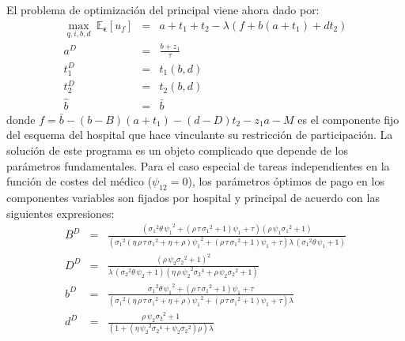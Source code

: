 ﻿\documentclass[12pt,letterpaper]{article}
\begin{document}
El problema de optimización del principal viene ahora dado por:
\begin{eqnarray*}
  \max\limits_{q,i,b,d}\ \mathbb{E}_{\mathbold{\epsilon}}[u_f]&=&a+t_1+t_2-\lambda\left (f+b(a+t_1)+dt_2\right ) \\
  a^D&=&\frac{b+z_1}{\tau}\\
  t_1^D &=& t_1(b,d) \\
  t_2^D &=& t_2(b,d)\\
  \hat{b}&=&\bar{b}
\end{eqnarray*}
donde $f=\bar{b}-(b-B)(a+t_1)-(d-D)t_2-z_1a-M$ es el componente fijo del esquema del hospital que hace vinculante su restricción de participación. La solución de este programa es un objeto complicado que depende de los parámetros fundamentales. Para el caso especial de tareas independientes en la función de costes del médico ($\psi_{12}=0$), los parámetros óptimos de pago en los componentes variables son fijados por hospital y principal de acuerdo con las siguientes expresiones:
\begin{eqnarray*}
  B^D &=& {\frac { \left( {\sigma_{{1}}}^{2}\theta\,{\psi_{{1}}}^{2}+ \left(\rho\,\tau\,{\sigma_{{1}}}^{2}+1 \right) \psi_{{1}}+\tau \right)
 \left( \rho\,\psi_{{1}}{\sigma_{{1}}}^{2}+1 \right) }{ \left( {\sigma
_{{1}}}^{2} \left( \eta\,\rho\,\tau\,{\sigma_{{1}}}^{2}+\eta+\rho
 \right) {\psi_{{1}}}^{2}+ \left( \rho\,\tau\,{\sigma_{{1}}}^{2}+1
 \right) \psi_{{1}}+\tau \right) \lambda\, \left( {\sigma_{{1}}}^{2}
\theta\,\psi_{{1}}+1 \right) }} \\
  D ^D&=& {\frac { \left( \rho\,\psi_{{2}}{\sigma_{{2}}}^{2}+1 \right) ^{2}}{
\lambda\, \left( {\sigma_{{2}}}^{2}\theta\,\psi_{{2}}+1 \right)
 \left( \eta\,\rho\,{\psi_{{2}}}^{2}{\sigma_{{2}}}^{4}+\rho\,\psi_{{2}
}{\sigma_{{2}}}^{2}+1 \right) }}\\
  b^D &=& {\frac {{\sigma_{{1}}}^{2}\theta\,{\psi_{{1}}}^{2}+ \left( \rho\,\tau
\,{\sigma_{{1}}}^{2}+1 \right) \psi_{{1}}+\tau}{ \left( {\sigma_{{1}}}
^{2} \left( \eta\,\rho\,\tau\,{\sigma_{{1}}}^{2}+\eta+\rho \right) {
\psi_{{1}}}^{2}+ \left( \rho\,\tau\,{\sigma_{{1}}}^{2}+1 \right) \psi_
{{1}}+\tau \right) \lambda}}\\
  d^D &=& {\frac {\rho\,\psi_{{2}}{\sigma_{{2}}}^{2}+1}{ \left( 1+ \left( \eta
\,{\psi_{{2}}}^{2}{\sigma_{{2}}}^{4}+\psi_{{2}}{\sigma_{{2}}}^{2}
 \right) \rho \right) \lambda}}
\end{eqnarray*}
\end{document}
